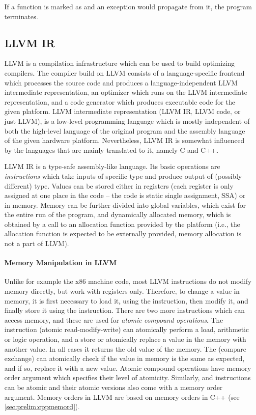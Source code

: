 If a function is marked as  and an exception would propagate from
it, the program terminates.


\subsection{LLVM IR} %

LLVM is a compilation infrastructure which can be used to build optimizing
compilers.
The compiler build on LLVM consists of a language-specific frontend which
processes the source code and produces a language-independent LLVM intermediate
representation, an optimizer which runs on the LLVM intermediate
representation, and a code generator which produces executable code for the
given platform.
LLVM intermediate representation (LLVM IR, LLVM code, or just LLVM), is a
low-level programming language which is mostly independent of both the
high-level language of the original program and the assembly language of the
given hardware platform.
Nevertheless, LLVM IR is somewhat influenced by the languages that are mainly
translated to it, namely C and C++.

LLVM IR is a type-safe assembly-like language.
Its basic operations are \emph{instructions} which take inputs of specific type
and produce output of (possibly different) type.
Values can be stored either in registers (each register is only assigned at one
place in the code -- the code is static single assignment, SSA) or in memory.
Memory can be further divided into global variables, which exist for the entire
run of the program, and dynamically allocated memory, which is obtained by a
call to an allocation function provided by the platform (i.e., the allocation
function is expected to be externally provided, memory allocation is not a part
of LLVM).

\paragraph{Memory Manipulation in LLVM}
Unlike for example the x86 machine code, most LLVM instructions do not modify
memory directly, but work with registers only.
Therefore, to change a value in memory, it is first necessary to load it, using
the  instruction, then modify it, and finally store it using the
 instruction.
There are two more instructions which can access memory, and these are used for
\emph{atomic compound operations}.
The  instruction (atomic read-modify-write) can atomically
perform a load, arithmetic or logic operation, and a store or atomically
replace a value in the memory with another value.
In all cases it returns the old value of the memory.
The  (compare exchange) can atomically check if the value in memory
is the same as expected, and if so, replace it with a new value.
Atomic compound operations have memory order argument which specifies their
level of atomicity.
Similarly,  and  instructions can be atomic and their atomic
versions also come with a memory order argument.
Memory orders in LLVM are based on memory orders in C++ (see
\autoref{sec:prelim:cppmemord}).

